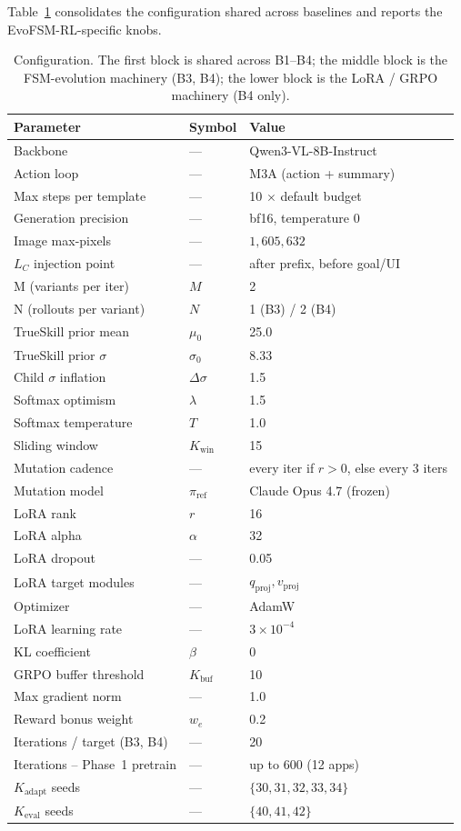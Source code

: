 Table~\ref{tab:hyper} consolidates the configuration shared across baselines and reports the EvoFSM-RL-specific knobs.

\begin{table}[t]
\small
\centering
\begin{tabular}{lll}
\hline
\textbf{Parameter} & \textbf{Symbol} & \textbf{Value} \\
\hline
Backbone & --- & Qwen3-VL-8B-Instruct \\
Action loop & --- & M3A (action + summary) \\
Max steps per template & --- & 10 $\times$ default budget \\
Generation precision & --- & bf16, temperature $0$ \\
Image max-pixels & --- & $1{,}605{,}632$ \\
\hline
$L_C$ injection point & --- & after prefix, before goal/UI \\
\hline
M (variants per iter) & $M$ & 2 \\
N (rollouts per variant) & $N$ & 1 (B3) / 2 (B4) \\
TrueSkill prior mean & $\mu_0$ & 25.0 \\
TrueSkill prior $\sigma$ & $\sigma_0$ & 8.33 \\
Child $\sigma$ inflation & $\Delta\sigma$ & 1.5 \\
Softmax optimism & $\lambda$ & 1.5 \\
Softmax temperature & $T$ & 1.0 \\
Sliding window & $K_{\text{win}}$ & 15 \\
Mutation cadence & --- & every iter if $r{>}0$, else every 3 iters \\
Mutation model & $\pi_{\text{ref}}$ & Claude Opus 4.7 (frozen) \\
\hline
LoRA rank & $r$ & 16 \\
LoRA alpha & $\alpha$ & 32 \\
LoRA dropout & --- & 0.05 \\
LoRA target modules & --- & $q_{\text{proj}}, v_{\text{proj}}$ \\
Optimizer & --- & AdamW \\
LoRA learning rate & --- & $3\!\times\!10^{-4}$ \\
KL coefficient & $\beta$ & 0 \\
GRPO buffer threshold & $K_{\text{buf}}$ & 10 \\
Max gradient norm & --- & 1.0 \\
\hline
Reward bonus weight & $w_e$ & 0.2 \\
\hline
Iterations / target (B3, B4) & --- & 20 \\
Iterations -- Phase~1 pretrain & --- & up to 600 (12 apps) \\
$K_{\text{adapt}}$ seeds & --- & $\{30,31,32,33,34\}$ \\
$K_{\text{eval}}$ seeds & --- & $\{40,41,42\}$ \\
\hline
\end{tabular}
\caption{Configuration. The first block is shared across B1--B4; the middle block is the FSM-evolution machinery (B3, B4); the lower block is the LoRA / GRPO machinery (B4 only).}
\label{tab:hyper}
\end{table}

